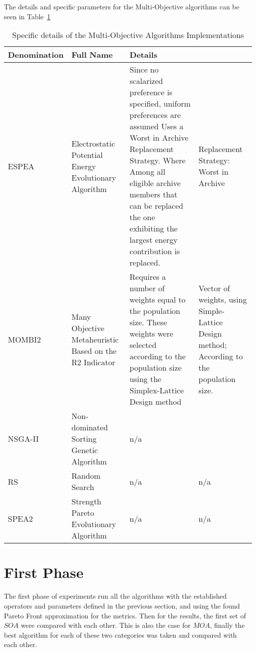 The details and specific parameters for the Multi-Objective algorithms can be seen in Table~\ref{table:moa_details}


\begin{table}[]
    \begin{tabular}{p{}p{}p{}p{}}
    \hline
    Denomination  & Full Name & Details \\
    \hline
    ESPEA         & Electrostatic Potential Energy Evolutionary Algorithm  & Since no scalarized preference is specified, uniform preferences are assumed
    Uses a Worst in Archive Replacement Strategy. 
    Where Among all eligible archive members that can be replaced the one exhibiting the largest energy contribution is replaced. & Replacement Strategy: Worst in Archive \\
    MOMBI2        & Many Objective Metaheuristic Based on the R2 Indicator & Requires a number of weights equal to the population size. These weights were selected according to the population size using the Simplex-Lattice Design method & Vector of weights, using Simple-Lattice Design method; According to the population size. \\
    NSGA-II       & Non-dominated Sorting Genetic Algorithm               & n/a \\
    RS           & Random Search                                          & n/a  & n/a \\
    SPEA2        & Strength Pareto Evolutionary Algorithm                 & n/a  & n/a \\
    \hline                                                                                                                 
    \end{tabular}
    \caption{Specific details of the Multi-Objective Algorithms Implementations}
    \label{table:moa_details}
\end{table}

\section{First Phase}

The first phase of experiments run all the algorithms with the established operators and parameters defined in the previous section, and using the found Pareto Front approximation for the metrics. Then for the results, the first set of $SOA$ were compared with each other. This is also the case for $MOA$, finally the best algorithm for each of these two categories was taken and compared with each other.

